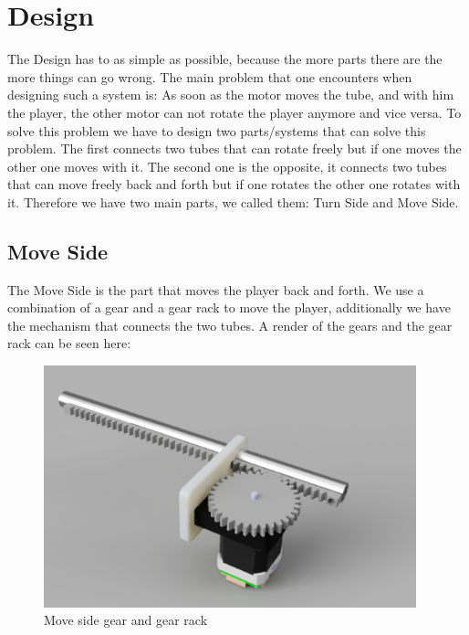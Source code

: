 \section{Design}\label{sec:design}
The Design has to as simple as possible, because the more parts there are the more things can go wrong.
The main problem that one encounters when designing such a system is:
As soon as the motor moves the tube, and with him the player, the other motor can not rotate the player anymore and vice versa.
To solve this problem we have to design two parts/systems that can solve this problem.
The first connects two tubes that can rotate freely but if one moves the other one moves with it.
The second one is the opposite, it connects two tubes that can move freely back and forth but if one rotates the other one rotates with it.
Therefore we have two main parts, we called them: Turn Side and Move Side.
\subsection{Move Side}\label{subsec:move-side}
The Move Side is the part that moves the player back and forth.
We use a combination of a gear and a gear rack to move the player, additionally we have the mechanism that connects the two tubes.
A render of the gears and the gear rack can be seen here:
\begin{figure}[H]
    \centering
    \includegraphics[height=7cm]{../photos/move_side_gear}
    \caption[moveside1]{Move side gear and gear rack}
    \label{fig:move_side_gear}
\end{figure}

